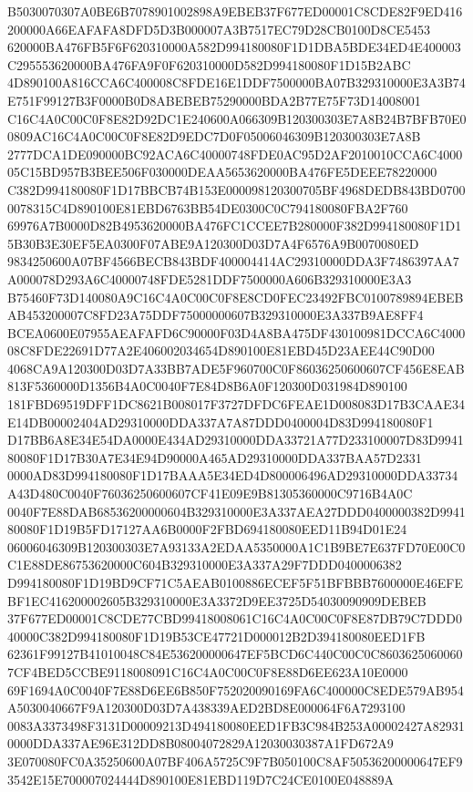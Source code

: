 \documentclass[UTF8,fontset=fandol,zihao=-4,a4paper]{ctexart}
\begin{document}
{{B5030070307A0BE6B7078901002898A9EBEB37F677ED00001C8CDE82F9ED416200000A66EAFAFA8DFD5D3B000007A3B7517EC79D28CB0100D8CE5453
620000BA476FB5F6F620310000A582D994180080F1D1DBA5BDE34ED4E400003C295553620000BA476FA9F0F620310000D582D994180080F1D15B2ABC
4D890100A816CCA6C400008C8FDE16E1DDF7500000BA07B329310000E3A3B74E751F99127B3F0000B0D8ABEBEB75290000BDA2B77E75F73D14008001
C16C4A0C00C0F8E82D92DC1E240600A066309B120300303E7A8B24B7BFB70E00809AC16C4A0C00C0F8E82D9EDC7D0F05006046309B120300303E7A8B
2777DCA1DE090000BC92ACA6C40000748FDE0AC95D2AF2010010CCA6C400005C15BD957B3BEE506F030000DEAA5653620000BA476FE5DEEE78220000
C382D994180080F1D17BBCB74B153E000098120300705BF4968DEDB843BD07000078315C4D890100E81EBD6763BB54DE0300C0C794180080FBA2F760
69976A7B0000D82B4953620000BA476FC1CCEE7B280000F382D994180080F1D15B30B3E30EF5EA0300F07ABE9A120300D03D7A4F6576A9B0070080ED
9834250600A07BF4566BECB843BDF400004414AC29310000DDA3F7486397AA7A000078D293A6C40000748FDE5281DDF7500000A606B329310000E3A3
B75460F73D140080A9C16C4A0C00C0F8E8CD0FEC23492FBC0100789894EBEBAB453200007C8FD23A75DDF75000000607B329310000E3A337B9AE8FF4
BCEA0600E07955AEAFAFD6C90000F03D4A8BA475DF430100981DCCA6C400008C8FDE22691D77A2E406002034654D890100E81EBD45D23AEE44C90D00
4068CA9A120300D03D7A33BB7ADE5F960700C0F86036250600607CF456E8EAB813F5360000D1356B4A0C0040F7E84D8B6A0F120300D031984D890100
181FBD69519DFF1DC8621B008017F3727DFDC6FEAE1D008083D17B3CAAE34E14DB00002404AD29310000DDA337A7A87DDD0400004D83D994180080F1
D17BB6A8E34E54DA0000E434AD29310000DDA33721A77D233100007D83D994180080F1D17B30A7E34E94D90000A465AD29310000DDA337BAA57D2331
0000AD83D994180080F1D17BAAA5E34ED4D800006496AD29310000DDA33734A43D480C0040F76036250600607CF41E09E9B81305360000C9716B4A0C
0040F7E88DAB68536200000604B329310000E3A337AEA27DDD0400000382D994180080F1D19B5FD17127AA6B0000F2FBD694180080EED11B94D01E24
06006046309B120300303E7A93133A2EDAA5350000A1C1B9BE7E637FD70E00C0C1E88DE86753620000C604B329310000E3A337A29F7DDD0400006382
D994180080F1D19BD9CF71C5AEAB0100886ECEF5F51BFBBB7600000E46EFEBF1EC416200002605B329310000E3A3372D9EE3725D54030090909DEBEB
37F677ED00001C8CDE77CBD99418008061C16C4A0C00C0F8E87DB79C7DDD040000C382D994180080F1D19B53CE47721D000012B2D394180080EED1FB
62361F99127B41010048C84E536200000647EF5BCD6C440C00C0C86036250600607CF4BED5CCBE9118008091C16C4A0C00C0F8E88D6EE623A10E0000
69F1694A0C0040F7E88D6EE6B850F752020090169FA6C400000C8EDE579AB954A5030040667F9A120300D03D7A438339AED2BD8E000064F6A7293100
0083A3373498F3131D00009213D494180080EED1FB3C984B253A00002427A829310000DDA337AE96E312DD8B08004072829A12030030387A1FD672A9
3E070080FC0A35250600A07BF406A5725C9F7B050100C8AF50536200000647EF93542E15E700007024444D890100E81EBD119D7C24CE0100E048889A
}}
\end{document}
